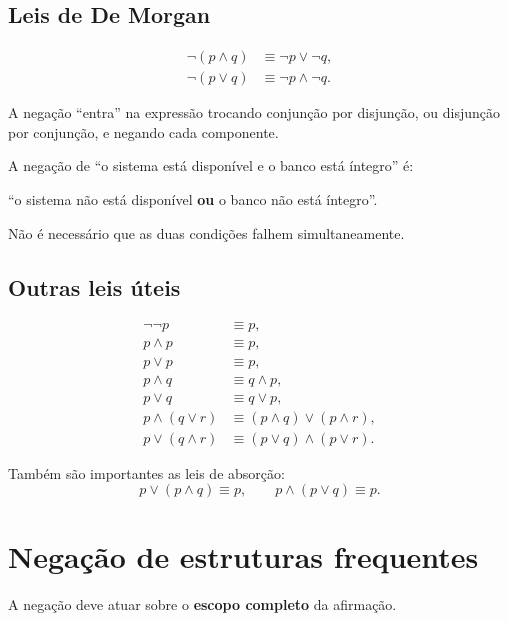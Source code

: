 \subsection{Leis de De Morgan}

\begin{align*}
\neg(p\land q) &\equiv \neg p\lor\neg q,\\
\neg(p\lor q) &\equiv \neg p\land\neg q.
\end{align*}

A negação ``entra'' na expressão trocando conjunção por disjunção, ou disjunção por conjunção, e negando cada componente.

\begin{exemplo}
A negação de ``o sistema está disponível e o banco está íntegro'' é:

``o sistema não está disponível \textbf{ou} o banco não está íntegro''.

Não é necessário que as duas condições falhem simultaneamente.
\end{exemplo}

\subsection{Outras leis úteis}

\begin{align*}
\neg\neg p &\equiv p,\\
p\land p &\equiv p,\\
p\lor p &\equiv p,\\
p\land q &\equiv q\land p,\\
p\lor q &\equiv q\lor p,\\
p\land(q\lor r)&\equiv(p\land q)\lor(p\land r),\\
p\lor(q\land r)&\equiv(p\lor q)\land(p\lor r).
\end{align*}

Também são importantes as leis de absorção:
\[
p\lor(p\land q)\equiv p,
\qquad
p\land(p\lor q)\equiv p.
\]

\section{Negação de estruturas frequentes}

A negação deve atuar sobre o \textbf{escopo completo} da afirmação.

